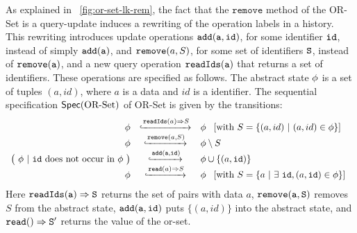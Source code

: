 \begin{example}
\label{definition:sequential specification of or-set}
As explained in \figureautorefname~\ref{fig:or-set-lk-rem}, the fact that the $\mathtt{remove}$
method of the OR-Set is a query-update induces a rewriting of the operation labels in a
history. This rewriting introduces update operations $\alabelshort[{\tt add}]{a,id}$, for some identifier ${\tt id}$, instead of simply $\alabelshort[{\tt add}]{a}$,
and $\alabelshort[\mathtt{remove}]{a,S}$, for some set of identifiers ${\tt S}$, instead of $\alabelshort[{\tt remove}]{a}$,
and a new query operation $\alabelshort[{\tt readIds}]{a}$ that returns a set of identifiers. These operations are specified as follows.
%
The abstract state $\abstate$ is a set of tuples $(a,id)$, where $a$
is a data and $id$ is a identifier. The sequential specification
$\specOrSet$ of OR-Set is given by the transitions:
\[
  \begin{array}{rcl}
    \abstate
    & \specarrow{\alabellong[\mathtt{readIds}]{a}{S}{}}
    & \abstate\
      \begin{array}{c}
        [\text{with}\ S = \{ (a,id)\ \vert\ (a,id) \in \abstate\}]
      \end{array}\\
    \abstate &
               \specarrow{\alabelshort[\mathtt{remove}]{a,S}}
    & \abstate \setminus S \\
    \big(\ \abstate\ |\ \mathtt{id}\ \text{does not occur in } \abstate\ \big)
             & \specarrow{ \alabelshort[{\tt add}]{a,id} }
    & \abstate \cup \{ (a,\mathtt{id}) \}\\
    \abstate
    & \specarrow{\alabellong[\mathtt{read}]{a}{ S }{}}
    & \abstate\
      \begin{array}{c}
        [\text{with}\ S = \{ a\ \vert\ \exists\ \mathtt{id}, (a,\mathtt{id}) \in \abstate \}]
      \end{array}
  \end{array}
\]
Here $\alabellong[{\tt readIds}]{a}{S}{}$ returns the set of pairs
with data $a$, $\alabelshort[{\tt remove}]{a,S}$ removes $S$ from the
abstract state, $\alabelshort[{\tt add}]{a,id}$ puts $\{ (a,id) \}$
into the abstract state, and $\alabellong[{\tt read}]{}{S'}{}$ returns
the value of the or-set.
\end{example}

